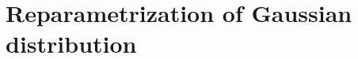 \documentclass[journal]{IEEEtran}
\begin{document}
\section{Reparametrization of Gaussian distribution}
\label{append:reparametrization-gaussian}

\end{document}
